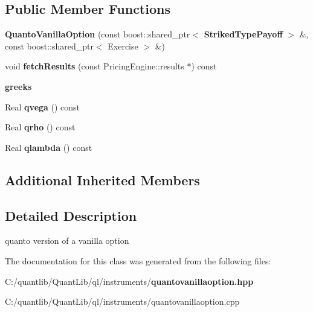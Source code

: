\subsection*{Public Member Functions}
\begin{DoxyCompactItemize}
\item 
{\bfseries Quanto\+Vanilla\+Option} (const boost\+::shared\+\_\+ptr$<$ {\bf Striked\+Type\+Payoff} $>$ \&, const boost\+::shared\+\_\+ptr$<$ Exercise $>$ \&)\label{class_quant_lib_1_1_quanto_vanilla_option_a83a88266067cd7af6e681f8d1692f928}

\item 
void {\bfseries fetch\+Results} (const Pricing\+Engine\+::results $\ast$) const \label{class_quant_lib_1_1_quanto_vanilla_option_a322b82c7fa2b5604829890338b7bccd2}

\end{DoxyCompactItemize}
\begin{Indent}{\bf greeks}\par
\begin{DoxyCompactItemize}
\item 
Real {\bfseries qvega} () const \label{class_quant_lib_1_1_quanto_vanilla_option_a4cc67eb7daba2a79b8b45cf76793be60}

\item 
Real {\bfseries qrho} () const \label{class_quant_lib_1_1_quanto_vanilla_option_a9f1d6ae2f28b4bd95f741a0b03a1c0bb}

\item 
Real {\bfseries qlambda} () const \label{class_quant_lib_1_1_quanto_vanilla_option_aa523ba367fb558aec168e5a0336ee476}

\end{DoxyCompactItemize}
\end{Indent}
\subsection*{Additional Inherited Members}


\subsection{Detailed Description}
quanto version of a vanilla option 



The documentation for this class was generated from the following files\+:\begin{DoxyCompactItemize}
\item 
C\+:/quantlib/\+Quant\+Lib/ql/instruments/{\bf quantovanillaoption.\+hpp}\item 
C\+:/quantlib/\+Quant\+Lib/ql/instruments/quantovanillaoption.\+cpp\end{DoxyCompactItemize}
